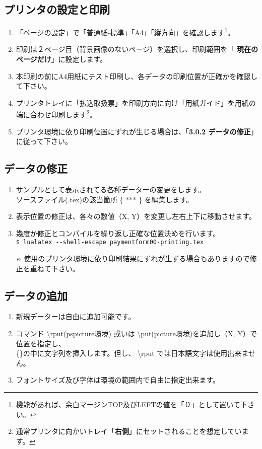 \documentclass[a4paper,10pt,titlepage]{ltjsarticle}
\def\colH#1{\color[HTML]{#1}}
\def\bs#1{\textbackslash{#1}}
\begin{document}
\subsection{プリンタの設定と印刷}
\begin{enumerate}
  \item 「ページの設定」で「普通紙-標準」「A4」「縦方向」を確認します\footnote{機能があれば、余白マージンTOP及びLEFTの値を「０」として置いて下さい。}。
  \item 印刷は２ページ目（背景画像のないページ）を選択し、印刷範囲を「{\bfseries\colH{800000} 現在のページだけ}」に設定します。
  \item 本印刷の前にA4用紙にテスト印刷し、各データの印刷位置が正確かを確認して下さい。
  \item プリンタトレイに「払込取扱票」を印刷方向に向け「用紙ガイド」を用紙の端に合わせ印刷します\footnote{通常プリンタに向かいトレイ「{\bfseries 右側}」にセットされることを想定しています。}。
  \item プリンタ環境に依り印刷位置にずれが生じる場合は、「{\bfseries 3.0.2 データの修正}」に従って下さい。

\end{enumerate}

\subsection{データの修正}
 \begin{enumerate}
   \item サンプルとして表示されてる各種データーの変更をします。\\
   ソースファイル(.tex)の該当箇所 \{\; *** \;\} を編集します。

   \item 表示位置の修正は、各々の数値（\;X, Y\;）を変更し左右上下に移動させます。

   \item 幾度か修正とコンパイルを繰り返し正確な位置決めを行います。\\
   \verb|$ lualatex --shell-escape paymentform00-printing.tex|           
  \item[※] 使用のプリンタ環境に依り印刷結果にずれが生ずる場合もありますので修正を重ねて下さい。
 \end{enumerate}

\subsection{データの追加}
 \begin{enumerate}
   \item 新規データーは自由に追加可能です。
   \item コマンド {\colH{800000} \bs rput}(pspicture環境) 或いは {\colH{800000} \bs put}(picture環境)を追加し（\;X, Y\;）で位置を指定し、\\
   \{\quad \}の中に文字列を挿入します。但し、 {\colH{800000} \bs rput では日本語文字は使用出来ません}。
   \item フォントサイズ及び字体は環境の範囲内で自由に指定出来ます。
   　
 \end{enumerate}
\end{document}
